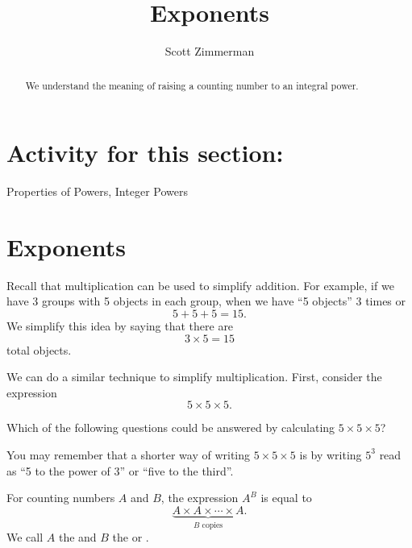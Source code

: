 \documentclass{ximera}
\title{Exponents}
\author{Scott Zimmerman}
\begin{document}
 
\begin{abstract}
We understand the meaning of raising a counting number to an integral power.
\end{abstract}
\maketitle
 
\section{Activity for this section:}
Properties of Powers, 
Integer Powers


 
\section{Exponents}

Recall that multiplication can be used to simplify addition. For example, if we have 3 groups with 5 objects in each group, when we have ``5 objects'' 3 times or
$$
5 + 5 + 5 = 15.
$$
We simplify this idea by saying that there are
$$
3 \times 5 = 15
$$
total objects.

We can do a similar technique to simplify multiplication.
First, consider the expression 
$$
5 \times 5 \times 5.
$$


\begin{question}
Which of the following questions could be answered by calculating $5 \times 5 \times 5$?
 
\begin{multipleChoice}
\end{multipleChoice}
\end{question}

You may remember that a shorter way of writing $5 \times 5 \times 5$ is by writing $5^3$ read as ``5 to the power of 3'' or ``five to the third''.

\begin{definition}
For counting numbers $A$ and $B$, the expression $A^B$ is equal to 
$$
\underbrace{A \times A \times \cdots \times A}_{B \text{ copies}}.
$$
We call $A$ the  and $B$ the  or .
\end{definition}
\end{document}
